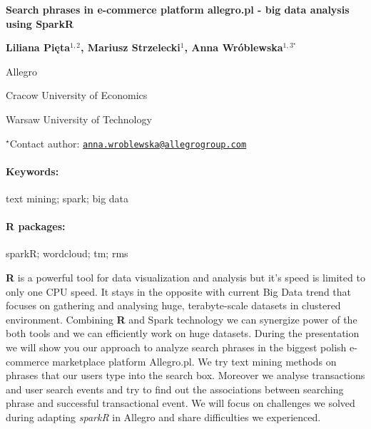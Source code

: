 \documentclass[11pt, a4paper]{article}
\renewcommand{\title}[1]{\begin{center}{\bf \LARGE #1}\end{center}}
\newcommand{\keywords}{\paragraph{Keywords:}}
\newcommand{\packages}{\paragraph{R packages:}}
\begin{document}
\pagestyle{empty}

\title{Search phrases in e-commerce platform allegro.pl - big data analysis
using SparkR}

\begin{center}
  {\bf Liliana Pięta$^{1, 2}$, Mariusz Strzelecki$^{1}$, Anna Wróblewska$^{1, 3^\star}$}
\end{center}

\vskip 0.3cm

\begin{affiliations}
\begin{enumerate}
\begin{minipage}{0.915\textwidth}
\centering
\item Allegro \\[-2pt]
\item Cracow University of Economics \\[-2pt]
\item Warsaw University of Technology \\[-2pt]
\end{minipage}
\end{enumerate}
$^\star$Contact author: \href{mailto:anna.wroblewska@allegrogroup.com}{\nolinkurl{anna.wroblewska@allegrogroup.com}}\\
\end{affiliations}

\vskip 0.5cm

\begin{minipage}{0.915\textwidth}
\keywords text mining; spark; big data
\packages sparkR; wordcloud; tm; rms
\end{minipage}

\vskip 0.8cm

\textbf{R} is a powerful tool for data visualization and analysis but
it's speed is limited to only one CPU speed. It stays in the opposite
with current Big Data trend that focuses on gathering and analysing
huge, terabyte-scale datasets in clustered environment. Combining
\textbf{R} and Spark technology we can synergize power of the both tools
and we can efficiently work on huge datasets. During the presentation we
will show you our approach to analyze search phrases in the biggest
polish e-commerce marketplace platform Allegro.pl. We try text mining
methods on phrases that our users type into the search box. Moreover we
analyse transactions and user search events and try to find out the
associations between searching phrase and successful transactional
event. We will focus on challenges we solved during adapting
\emph{sparkR} in Allegro and share difficulties we experienced.
\end{document}
